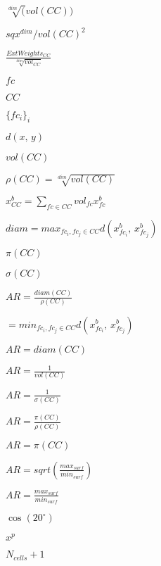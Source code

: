 \documentclass{article}
\begin{document}
$ \sqrt[dim](vol(CC)) $
\pagebreak

$ sqx^{dim} / vol(CC)^2 $
\pagebreak

$ \frac{ExtWeights_{CC}}{\sqrt[dim]{vol_{CC}}} $
\pagebreak

$ fc $
\pagebreak

$ CC $
\pagebreak

$ \{fc_i\}_i $
\pagebreak

$ d(x,\, y) $
\pagebreak

$ vol(CC) $
\pagebreak

$ \rho(CC) = \sqrt[dim]{vol(CC)} $
\pagebreak

$ x^b_{CC} = \sum_{fc \in CC} vol_{fc} x^b_{fc} $
\pagebreak

$ diam = max_{fc_i, fc_j \in CC} d(x^b_{fc_i},\, x^b_{fc_j}) $
\pagebreak

$ \pi(CC) $
\pagebreak

$ \sigma(CC) $
\pagebreak

$ AR = \frac{diam(CC)}{\rho(CC)} $
\pagebreak

$ =min_{fc_i, fc_j \in CC}
 d(x^b_{fc_i},\, x^b_{fc_j}) $
\pagebreak

$ AR = diam(CC) $
\pagebreak

$ AR = \frac{1}{vol(CC)} $
\pagebreak

$ AR = \frac{1}{\sigma(CC)} $
\pagebreak

$ AR = \frac{\pi(CC)}{\rho(CC)} $
\pagebreak

$ AR = \pi(CC) $
\pagebreak

$ AR = sqrt(\frac{max_{surf}}{min_{surf}}) $
\pagebreak

$ AR = \frac{max_{surf}}{min_{surf}} $
\pagebreak

$ \cos(20^\circ) $
\pagebreak

$ x^p $
\pagebreak

$ N_{cells} + 1 $
\pagebreak
\end{document}
